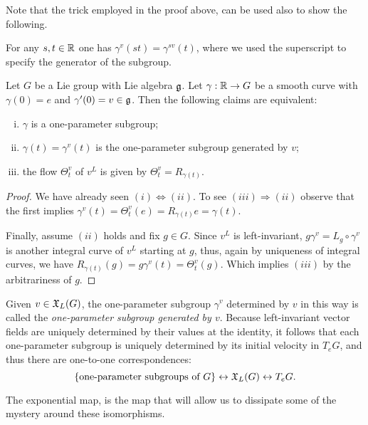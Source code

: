 Note that the trick employed in the proof above, can be used also to show the following.
\begin{lemma}
	For any $s,t\in\mathbb{R}$ one has $\gamma^v(st) = \gamma^{sv}(t)$, where we used the superscript to specify the generator of the subgroup.
\end{lemma}

\begin{proposition}\label{prop:liflow}
	Let $G$ be a Lie group with Lie algebra $\mathfrak{g}$.
	Let $\gamma:\mathbb{R}\to G$ be a smooth curve with $\gamma(0)=e$ and $\gamma'(0)=v\in\mathfrak{g}$. Then the following claims are equivalent:
	\begin{enumerate}[(i)]
		\item $\gamma$ is a one-parameter subgroup;
		\item $\gamma(t) = \gamma^v(t)$ is the one-parameter subgroup generated by $v$;
		\item the flow $\Theta_t^v$ of $v^L$ is given by $\Theta_t^v = R_{\gamma(t)}$.
	\end{enumerate}
\end{proposition}
\begin{proof}
	We have already seen $(i) \Leftrightarrow (ii)$.
	To see $(iii)\Rightarrow(ii)$ observe that the first implies $\gamma^v(t) = \Theta_t^v(e) = R_{\gamma(t)}e = \gamma(t)$.

	Finally, assume $(ii)$ holds and fix $g\in G$.
	Since $v^L$ is left-invariant, $g\gamma^v = L_g \circ \gamma^v$ is another integral curve of $v^L$ starting at $g$, thus, again by uniqueness of integral curves, we have $R_{\gamma(t)}(g) = g\gamma^v(t) = \Theta_t^v(g)$. Which implies $(iii)$ by the arbitrariness of $g$.
\end{proof}

Given $v\in\mathfrak{X}_L(G)$, the one-parameter subgroup $\gamma^v$ determined by $v$ in this way is called the \emph{one-parameter subgroup generated by $v$}.
Because left-invariant vector fields are uniquely determined by their values at the identity, it follows that each one-parameter subgroup is uniquely determined by its initial velocity in $T_eG$, and thus there are one-to-one correspondences:
\begin{equation}
	\{\mbox{one-parameter subgroups of }G\}
	\leftrightarrow
	\mathfrak{X}_L(G)
	\leftrightarrow
	T_e G.
\end{equation}

The exponential map, is the map that will allow us to dissipate some of the mystery around these isomorphisms.

